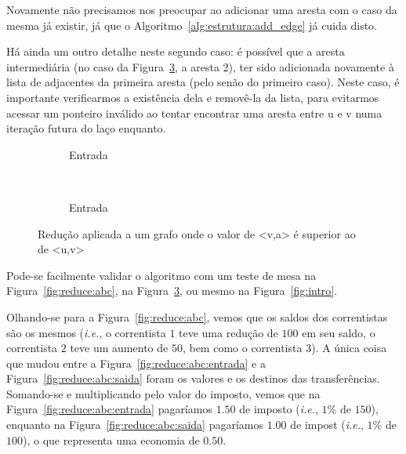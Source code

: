 \documentclass[12pt]{article}
\begin{document}
Novamente não precisamos nos preocupar ao adicionar uma aresta com o caso da
mesma já existir, já que o Algoritmo~\ref{alg:estrutura:add_edge} já cuida disto.

Há ainda um outro detalhe neste segundo caso: é possível que a aresta
intermediária (no caso da Figura~\ref{fig:reduce:uva}, a aresta 2), ter sido
adicionada novamente à lista de adjacentes da primeira aresta (pelo
\textsf{senão} do primeiro caso). Neste caso, é importante verificarmos a
existência dela e removê-la da lista, para evitarmos acessar um ponteiro
inválido ao tentar encontrar uma aresta entre \textsf{u} e \textsf{v} numa
iteração futura do laço \textsf{enquanto}.

\begin{figure}[H]
  \centering
  \begin{subfigure}[b]{0.5\textwidth}
    \begin{dot2tex}[neato,options=-tmath]
      
    \end{dot2tex}
    \caption{Entrada}
    \label{fig:reduce:uva:entrada}
  \end{subfigure}%
  ~
  \begin{subfigure}[b]{0.5\textwidth}
    \begin{dot2tex}[neato,options=-tmath]
      
    \end{dot2tex}
    \caption{Entrada}
    \label{fig:reduce:uva:saida}
  \end{subfigure}
  \caption{Redução aplicada a um grafo onde o valor de <v,a> é superior ao de
    <u,v>}
  \label{fig:reduce:uva}
\end{figure}

Pode-se facilmente validar o algoritmo com um teste de mesa na
Figura~\ref{fig:reduce:abc}, na Figura~\ref{fig:reduce:uva}, ou mesmo na
Figura~\ref{fig:intro}.

Olhando-se para a Figura~\ref{fig:reduce:abc}, vemos que os saldos dos
correntistas são os mesmos (\textit{i.e.}, o correntista $1$ teve uma redução de
$100$ em seu saldo, o correntista $2$ teve um aumento de $50$, bem como o
correntista $3$). A única coisa que mudou entre a
Figura~\ref{fig:reduce:abc:entrada} e a Figura~\ref{fig:reduce:abc:saida} foram
os valores e os destinos das transferências. Somando-se e multiplicando pelo
valor do imposto, vemos que na Figura~\ref{fig:reduce:abc:entrada} pagaríamos
$1.50$ de imposto (\textit{i.e.}, $1\%$ de $150$), enquanto na
Figura~\ref{fig:reduce:abc:saida} pagaríamos $1.00$ de impost (\textit{i.e.},
$1\%$ de $100$), o que representa uma economia de $0.50$.
\end{document}
